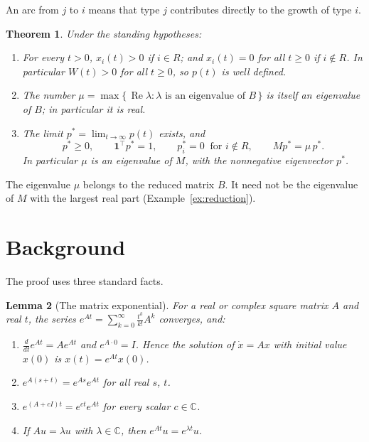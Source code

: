 \documentclass[11pt]{article}
\newtheorem{theorem}{Theorem}
\newtheorem{lemma}[theorem]{Lemma}
\theoremstyle{definition}
\theoremstyle{remark}
\newcommand{\C}{\mathbb{C}}
\newcommand{\one}{\mathbf{1}}
\newcommand{\T}{\top}
\renewcommand{\Re}{\operatorname{Re}}
\begin{document}
An arc from $j$ to $i$ means that type $j$ contributes directly to the growth of type $i$.

\begin{theorem}\label{thm:main}
Under the standing hypotheses:
\begin{enumerate}
  \item\label{thm:main:support} For every $t > 0$, $x_i(t) > 0$ if $i \in R$; and $x_i(t) = 0$ for
        all $t \ge 0$ if $i \notin R$. In particular $W(t) > 0$ for all $t \ge 0$, so $p(t)$ is
        well defined.
  \item\label{thm:main:mu} The number
        $\mu = \max\{\, \Re\lambda : \lambda \text{ is an eigenvalue of } B \,\}$
        is itself an eigenvalue of $B$; in particular it is real.
  \item\label{thm:main:limit} The limit $p^* = \lim_{t \to \infty} p(t)$ exists, and
        \[
          p^* \ge 0, \qquad \one^\T p^* = 1, \qquad p^*_i = 0 \ \text{ for } i \notin R,
          \qquad M p^* = \mu\, p^* .
        \]
        In particular $\mu$ is an eigenvalue of $M$, with the nonnegative eigenvector $p^*$.
\end{enumerate}
\end{theorem}

The eigenvalue $\mu$ belongs to the reduced matrix $B$. It need not be the eigenvalue of $M$ with
the largest real part (Example~\ref{ex:reduction}).

\section{Background}\label{sec:background}

The proof uses three standard facts.

\begin{lemma}[The matrix exponential]\label{lem:exp}
For a real or complex square matrix $A$ and real $t$, the series
$e^{At} = \sum_{k=0}^{\infty} \frac{t^k}{k!} A^k$ converges, and:
\begin{enumerate}
  \item\label{lem:exp:ode} $\frac{d}{dt} e^{At} = A e^{At}$ and $e^{A \cdot 0} = I$. Hence the
        solution of $\dot{x} = Ax$ with initial value $x(0)$ is $x(t) = e^{At} x(0)$.
  \item\label{lem:exp:semigroup} $e^{A(s+t)} = e^{As} e^{At}$ for all real $s$, $t$.
  \item\label{lem:exp:shift} $e^{(A + cI)t} = e^{ct} e^{At}$ for every scalar $c \in \C$.
  \item\label{lem:exp:eig} If $Au = \lambda u$ with $\lambda \in \C$, then $e^{At} u = e^{\lambda t} u$.
\end{enumerate}
\end{lemma}
\end{document}
